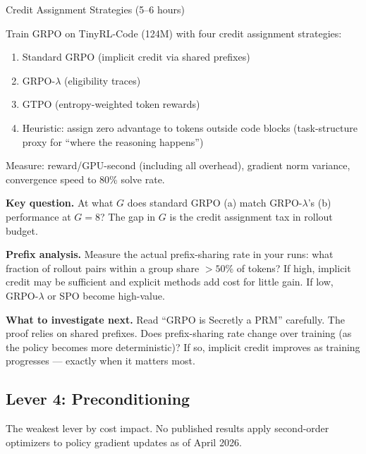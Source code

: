 \begin{exercise}{Credit Assignment Strategies (5--6 hours)}

Train GRPO on TinyRL-Code (124M) with four credit assignment strategies:
\begin{enumerate}[label=(\alph*)]
  \item Standard GRPO (implicit credit via shared prefixes)
  \item GRPO-$\lambda$ (eligibility traces)
  \item GTPO (entropy-weighted token rewards)
  \item Heuristic: assign zero advantage to tokens outside code blocks (task-structure proxy for ``where the reasoning happens'')
\end{enumerate}

Measure: reward/GPU-second (including all overhead), gradient norm variance, convergence speed to 80\% solve rate.

\textbf{Key question.} At what $G$ does standard GRPO (a) match GRPO-$\lambda$'s (b) performance at $G = 8$? The gap in $G$ is the credit assignment tax in rollout budget.

\textbf{Prefix analysis.} Measure the actual prefix-sharing rate in your runs: what fraction of rollout pairs within a group share $> 50$\% of tokens? If high, implicit credit may be sufficient and explicit methods add cost for little gain. If low, GRPO-$\lambda$ or SPO become high-value.

\textbf{What to investigate next.} Read ``GRPO is Secretly a PRM'' carefully. The proof relies on shared prefixes. Does prefix-sharing rate change over training (as the policy becomes more deterministic)? If so, implicit credit improves as training progresses --- exactly when it matters most.
\end{exercise}

\subsection{Lever 4: Preconditioning}

The weakest lever by cost impact. No published results apply second-order optimizers to policy gradient updates as of April 2026.

